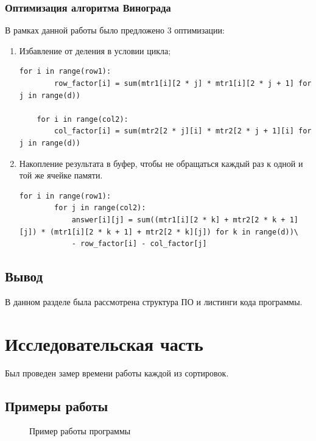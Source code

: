\documentclass[12pt]{report}
\begin{document}
\subsection{Оптимизация алгоритма Винограда}
В рамках данной работы было предложено 3 оптимизации:
\begin{enumerate}
	\item Избавление от деления в условии цикла;
	\newpage
	\begin{lstlisting}[label=some-code,caption=Оптимизации алгоритма Винограда №1 и №2]
    for i in range(row1):
		row_factor[i] = sum(mtr1[i][2 * j] * mtr1[i][2 * j + 1] for j in range(d))

	for i in range(col2):
		col_factor[i] = sum(mtr2[2 * j][i] * mtr2[2 * j + 1][i] for j in range(d))

	\end{lstlisting}
	
	\item Накопление результата в буфер, чтобы не обращаться каждый раз к одной и той же ячейке памяти.
	\begin{lstlisting}[label=some-code,caption=Оптимизации алгоритма Винограда №3]
    for i in range(row1):
		for j in range(col2):
			answer[i][j] = sum((mtr1[i][2 * k] + mtr2[2 * k + 1][j]) * (mtr1[i][2 * k + 1] + mtr2[2 * k][j]) for k in range(d))\
			- row_factor[i] - col_factor[j]
	\end{lstlisting}
\end{enumerate}

\section{Вывод}
В данном разделе была рассмотрена структура ПО и листинги кода программы.

\chapter{Исследовательская часть}
Был проведен замер времени работы каждой из сортировок.
\section{Примеры работы}
\begin{figure}[h]
	\caption{Пример работы программы}
	\label{ris:example}
\end{figure}
\end{document}
